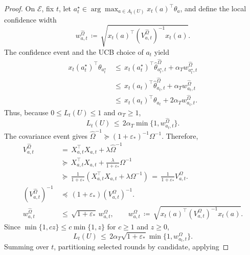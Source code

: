 \documentclass{article} %
\begin{document}
\begin{proof}
On \(\mathcal E\), fix \(t\), let
\(a_t^\star\in\arg\max_{a\in A_t(U)}x_t(a)^\top\theta_a\), and define the
local confidence width
\begin{equation}
w_{a,t}^{\widehat\Omega}
\,\coloneqq\,
\sqrt{x_t(a)^\top(V_{a,t}^{\widehat\Omega})^{-1}x_t(a)}.
\end{equation}
The confidence event and the UCB choice of \(a_t\) yield
\begin{equation}
\begin{aligned}
x_t(a_t^\star)^\top\theta_{a_t^\star}
&\,\leq\,
x_t(a_t^\star)^\top
\widehat\theta_{a_t^\star,t}^{\widehat\Omega}
+\alpha_Tw_{a_t^\star,t}^{\widehat\Omega}
\\
&\,\leq\,
x_t(a_t)^\top\widehat\theta_{a_t,t}^{\widehat\Omega}
+\alpha_Tw_{a_t,t}^{\widehat\Omega}
\\
&\,\leq\,
x_t(a_t)^\top\theta_{a_t}
+2\alpha_Tw_{a_t,t}^{\widehat\Omega}.
\end{aligned}
\end{equation}
Thus, because \(0\leq L_t(U)\leq1\) and \(\alpha_T\geq1\),
\begin{equation}
L_t(U)
\,\leq\,
2\alpha_T\min\{1,w_{a_t,t}^{\widehat\Omega}\}.
\end{equation}
The covariance event gives
\(\widehat\Omega^{-1}\succeq(1+\varepsilon_*)^{-1}\Omega^{-1}\). Therefore,
\begin{equation}
\begin{aligned}
V_{a,t}^{\widehat\Omega}
&\,=\,
X_{a,t}^\top X_{a,t}+\lambda\widehat\Omega^{-1}
\\
&\,\succeq\,
X_{a,t}^\top X_{a,t}
+
\frac{\lambda}{1+\varepsilon_*}\Omega^{-1}
\\
&\,\succeq\,
\frac{1}{1+\varepsilon_*}
\left(
X_{a,t}^\top X_{a,t}+\lambda\Omega^{-1}
\right)
\,=\,
\frac{1}{1+\varepsilon_*}V_{a,t}^{\Omega}.
\\
(V_{a,t}^{\widehat\Omega})^{-1}
&\,\preceq\,
(1+\varepsilon_*)(V_{a,t}^{\Omega})^{-1}.
\\
w_{a,t}^{\widehat\Omega}
&\,\leq\,
\sqrt{1+\varepsilon_*}\,
w_{a,t}^{\Omega},
\qquad
w_{a,t}^{\Omega}
\,\coloneqq\,
\sqrt{x_t(a)^\top(V_{a,t}^{\Omega})^{-1}x_t(a)}.
\end{aligned}
\end{equation}
Since \(\min\{1,cz\}\leq c\min\{1,z\}\) for \(c\geq1\) and \(z\geq0\),
\begin{equation}
L_t(U)
\,\leq\,
2\alpha_T\sqrt{1+\varepsilon_*}
\min\{1,w_{a_t,t}^{\Omega}\}.
\end{equation}
Summing over \(t\), partitioning selected rounds by candidate, applying

\end{proof}
\end{document}

